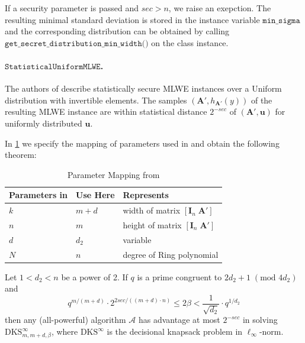 If a security parameter is passed and $sec > n$, we raise an exepction.
The resulting minimal standard deviation is stored in the instance variable $\texttt{min\_sigma}$ and the corresponding distribution can be obtained by calling $\texttt{get\_secret\_distribution\_min\_width()}$ on the class instance.



\paragraph{$\texttt{StatisticalUniformMLWE}$.} The authors of \cite{BDLOP18} describe statistically secure MLWE instances over a Uniform distribution with invertible elements. The samples $(\mathbf{A}', h_{\mathbf{A}'}(y))$ of the resulting MLWE instance are within statistical distance $2^{-sec}$ of $(\mathbf{A}', \mathbf{u})$ for uniformly distributed $\mathbf{u}$. %

In \cref{tab:mapping-BDLOP18} we specify the mapping of parameters used in \cite{BDLOP18} and obtain the following theorem: %

\begin{table}
    \centering
    \begin{tabular}[h]{lll}
        \toprule
        Parameters in \cite{BDLOP18} & Use Here & Represents                                         \\\hline
        $k$                          & $m+d$    & width of matrix $[ \mathbf{I}_n \; \mathbf{A}' ]$  \\
        $n$                          & $m$      & height of matrix $[ \mathbf{I}_n \; \mathbf{A}' ]$ \\
        $d$                          & $d_2$    & variable                                           \\
        $N$                          & $n$      & degree of Ring polynomial                          \\
        \bottomrule
    \end{tabular}
    \caption{Parameter Mapping from \cite{BDLOP18}}\label{tab:mapping-BDLOP18}
\end{table}


\begin{theorem}
    Let $1 < d_2 < n$ be a power of 2. If $q$ is a prime congruent to $2d_2 + 1 \;(\text{mod } 4d_2)$ and
    \begin{equation}
        q^{m/(m+d)} \cdot 2^{2 sec/((m+d)\cdot n)} \leq 2 \beta < \frac{1}{\sqrt{d_2}} \cdot q^{1/d_2}
    \end{equation}
    then any (all-powerful) algorithm $\mathcal{A}$ has advantage at most $2^{-sec}$ in solving $\text{DKS}_{m,m+d,\beta}^\infty$, where $\text{DKS}^\infty$ is the decisional knapsack problem in $\ell_\infty$-norm.
\end{theorem}


